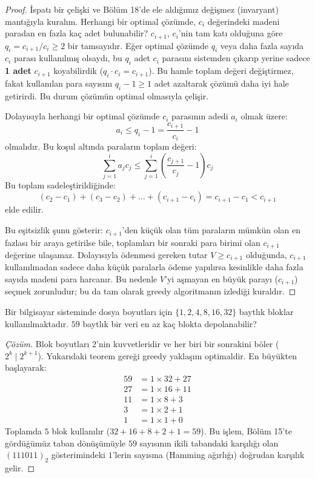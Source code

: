 \begin{proof}
İspatı bir çelişki ve Bölüm 18'de ele aldığımız değişmez (invaryant) mantığıyla kuralım.
Herhangi bir optimal çözümde, $c_i$ değerindeki madeni paradan en fazla kaç adet bulunabilir?
$c_{i+1}$, $c_i$'nin tam katı olduğuna göre $q_i = c_{i+1} / c_i \ge 2$ bir tamsayıdır.
Eğer optimal çözümde $q_i$ veya daha fazla sayıda $c_i$ parası kullanılmış olsaydı, bu $q_i$ adet $c_i$ parasını sistemden çıkarıp yerine sadece \textbf{1 adet} $c_{i+1}$ koyabilirdik ($q_i \cdot c_i = c_{i+1}$). Bu hamle toplam değeri değiştirmez, fakat kullanılan para sayısını $q_i - 1 \ge 1$ adet azaltarak çözümü daha iyi hale getirirdi. Bu durum çözümün optimal olmasıyla çelişir.

Dolayısıyla herhangi bir optimal çözümde $c_i$ parasının adedi $a_i$ olmak üzere:
\[
a_i \le q_i - 1 = \frac{c_{i+1}}{c_i} - 1
\]
olmalıdır.
Bu koşul altında paraların toplam değeri:
\[
\sum_{j=1}^{i} a_j c_j \le \sum_{j=1}^{i} \left(\frac{c_{j+1}}{c_j} - 1\right) c_j
\]
Bu toplam sadeleştirildiğinde:
\[
(c_2 - c_1) + (c_3 - c_2) + \dots + (c_{i+1} - c_i) = c_{i+1} - c_1 < c_{i+1}
\]
elde edilir.

Bu eşitsizlik şunu gösterir: $c_{i+1}$'den küçük olan tüm paraların mümkün olan en fazlası bir araya getirilse bile, toplamları bir sonraki para birimi olan $c_{i+1}$ değerine ulaşamaz.
Dolayısıyla ödenmesi gereken tutar $V \ge c_{i+1}$ olduğunda, $c_{i+1}$ kullanılmadan sadece daha küçük paralarla ödeme yapılırsa kesinlikle daha fazla sayıda madeni para harcanır. Bu nedenle $V$'yi aşmayan en büyük parayı ($c_{i+1}$) seçmek zorunludur; bu da tam olarak greedy algoritmanın izlediği kuraldır.
\end{proof}

\begin{example}
Bir bilgisayar sisteminde dosya boyutları için $\{1, 2, 4, 8, 16, 32\}$ baytlık bloklar kullanılmaktadır. $59$ baytlık bir veri en az kaç blokta depolanabilir?
\end{example}

\begin{proof}[Çözüm]
Blok boyutları $2$'nin kuvvetleridir ve her biri bir sonrakini böler ($2^k \mid 2^{k+1}$). Yukarıdaki teorem gereği greedy yaklaşım optimaldir.
En büyükten başlayarak:
\begin{align*}
59 &= 1 \times 32 + 27 \\
27 &= 1 \times 16 + 11 \\
11 &= 1 \times 8 + 3 \\
3 &= 1 \times 2 + 1 \\
1 &= 1 \times 1 + 0
\end{align*}
Toplamda $5$ blok kullanılır ($32 + 16 + 8 + 2 + 1 = 59$). Bu işlem, Bölüm 15'te gördüğümüz taban dönüşümüyle $59$ sayısının ikili tabandaki karşılığı olan $(111011)_2$ gösterimindeki $1$'lerin sayısına (Hamming ağırlığı) doğrudan karşılık gelir.
\end{proof}

